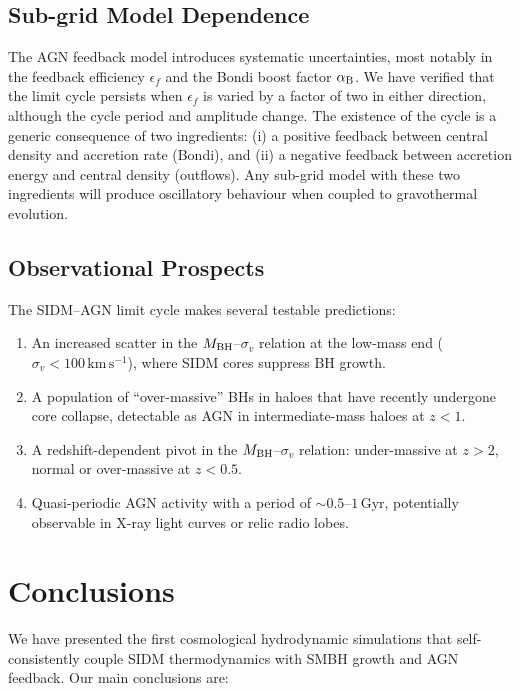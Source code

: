 \documentclass[fleqn,usenatbib]{mnras}
\newcommand{\kms}{\,\mathrm{km\,s^{-1}}}
\newcommand{\Gyr}{\,\mathrm{Gyr}}
\newcommand{\MBH}{M_{\rm BH}}
\newcommand{\vdisp}{\sigma_v}
\begin{document}
\subsection{Sub-grid Model Dependence}

The AGN feedback model introduces systematic uncertainties, most
notably in the feedback efficiency $\epsilon_f$ and the Bondi boost
factor $\alpha_{\rm B}$.  We have verified that the limit cycle
persists when $\epsilon_f$ is varied by a factor of two in either
direction, although the cycle period and amplitude change.  The
existence of the cycle is a generic consequence of two ingredients:
(i) a positive feedback between central density and accretion rate
(Bondi), and (ii) a negative feedback between accretion energy and
central density (outflows).  Any sub-grid model with these two
ingredients will produce oscillatory behaviour when coupled to
gravothermal evolution.

\subsection{Observational Prospects}

The SIDM--AGN limit cycle makes several testable predictions:
\begin{enumerate}
  \item An increased scatter in the $\MBH$--$\vdisp$ relation at the
    low-mass end ($\vdisp < 100\kms$), where SIDM cores suppress BH
    growth.
  \item A population of ``over-massive'' BHs in haloes that have
    recently undergone core collapse, detectable as AGN in
    intermediate-mass haloes at $z < 1$.
  \item A redshift-dependent pivot in the $\MBH$--$\vdisp$ relation:
    under-massive at $z > 2$, normal or over-massive at $z < 0.5$.
  \item Quasi-periodic AGN activity with a period of $\sim 0.5$--$1\Gyr$,
    potentially observable in X-ray light curves or relic radio lobes.
\end{enumerate}


\section{Conclusions}
\label{sec:conclusions}

We have presented the first cosmological hydrodynamic simulations that
self-consistently couple SIDM thermodynamics with SMBH growth and AGN
feedback.  Our main conclusions are:
\end{document}
